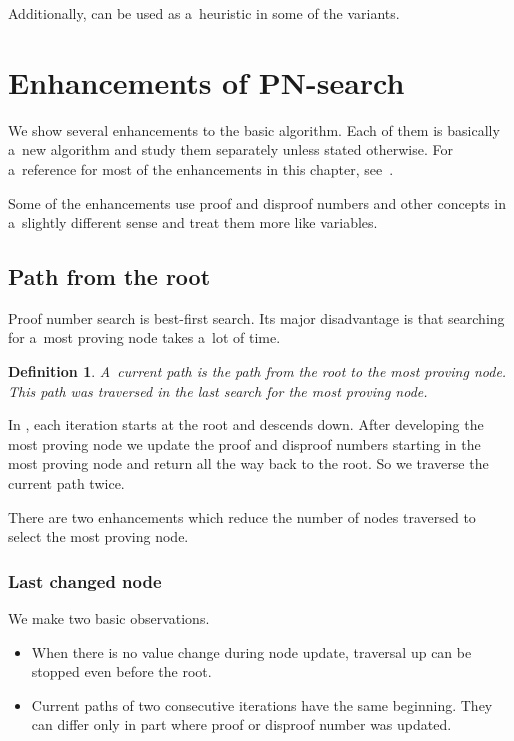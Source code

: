Additionally,  can be used as a~heuristic in some of the  variants.

\section{Enhancements of PN-search}

We show several enhancements to the basic  algorithm. Each
of them is basically a~new algorithm and study them separately
unless stated otherwise. For a~reference for most of the enhancements
in this chapter, see~\cite{allis}.

Some of the enhancements use proof and disproof numbers and other concepts
in a~slightly different sense and treat them more like variables. 

\subsection{Path from the root}

Proof number search is best-first search. Its major disadvantage is that
searching for a~most proving node takes a~lot of time. 

\newtheorem*{currentPath}{Definition}	
\begin{currentPath}
	A~{\sl current path} is the path from the root to the most proving node.
	This path was traversed in the last search for the most proving node.
\end{currentPath}

In , each iteration starts at the root and descends down. After developing
the most proving node we update the proof and disproof numbers starting in the most proving node and 
return all the way back to the root. So we traverse the current path twice. 

There are two enhancements which reduce the number of nodes traversed to select the
most proving node. 

\subsubsection{Last changed node} \label{last}

We make two basic observations.
\begin{itemize}
\item When there is no value change during node update, traversal up can be stopped even before the root.
\item Current paths of two consecutive iterations have the same beginning. They can differ
only in part where proof or disproof number was updated.
\end{itemize}

